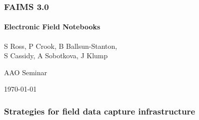 \documentclass[
	aspectratio=169, %
	12pt, %
	t, %
]{beamer}
\begin{document}
\begin{refsegment}




\begin{titleframe} %
	\frametitle{FAIMS 3.0}
	\framesubtitle{Electronic Field Notebooks}

	S Ross, P Crook, B Ballsun-Stanton,\\ S Cassidy, A Sobotkova, J Klump

    \medskip
	AAO Seminar

	\vfill

	\today
	
\end{titleframe}





\begin{frame}
    \frametitle{Strategies for field data capture infrastructure}
    

\end{frame}
\end{refsegment}
\end{document}
